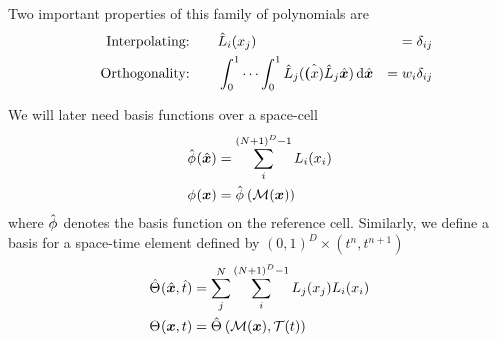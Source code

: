 Two important properties of this family of polynomials are
  \begin{alignat}{10}
    \label{eq:basis-interpolating}
&& \text{Interpolating:} \qquad & \lagrangeRef[i] (x_j) &= \delta_{ij}\\
\label{eq:basis-orthogonality}
&& \text{Orthogonality:} \qquad &
\int_0^1 \cdots \int_0^1 \lagrangeRef[j](\hat{\bm(x)} \lagrangeRef[j]{\hat{\bm{x}}}) \dd{\hat{\bm{x}}}  &= \quadWeight[i] \delta_{ij}
    \end{alignat}

We will later need basis functions over a space-cell 
\begin{align}\label{eq:space-basis}
  \begin{split}
  \sbasisRef(\hat{\bm{x}}) &= \sum_i^{(N+1)^D - 1} \lagrange[i] (x_i)\\
  \sbasis(\bm{x}) &= \sbasisRef \left( \mapping(\bm{x}) \right)
  \end{split}
\end{align}
where $\sbasisRef$ denotes the basis function on the reference cell.
Similarly, we define a basis for a space-time element defined by $(0, 1)^D \times (t^n, t^{n+1})$
\begin{align}\label{eq:space-time-basis}
  \begin{split}
  \stbasisRef(\hat{\bm{x}}, \hat{t}) &= \sum_j^{N} \sum_i^{(N+1)^D - 1} \lagrange[j](x_j) \lagrange[i] (x_i)\\
  \stbasis (\bm{x}, t) &= \stbasisRef \left( \mapping(\bm{x}), \timeMapping(t) \right)
  \end{split}
\end{align}


